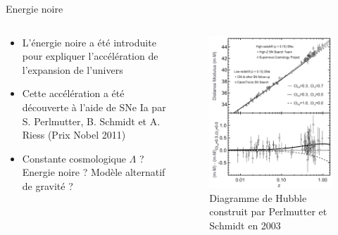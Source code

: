 \documentclass{beamer}
\begin{document}
\begin{frame}{Energie noire}
\begin{columns}
\begin{column}{0.6\textwidth}
	\begin{itemize}
\item L'énergie noire a été introduite pour expliquer l'accélération de l'expansion de l'univers
\item	Cette accélération a été découverte à l'aide de SNe Ia par S. Perlmutter, B. Schmidt et A. Riess (Prix Nobel 2011)
\item Constante cosmologique $\Lambda$ ? Energie noire ? Modèle alternatif de gravité ?
\end{itemize}
\end{column}
\begin{column}{0.4\textwidth}
	\begin{figure}
		\centering
		\includegraphics[height=0.6\textheight]{figures/Perlmutter_Schmidt.png}
		\caption{Diagramme de Hubble construit par Perlmutter et Schmidt en 2003}
	\end{figure}
\end{column}
\end{columns}
\end{frame}
\end{document}
